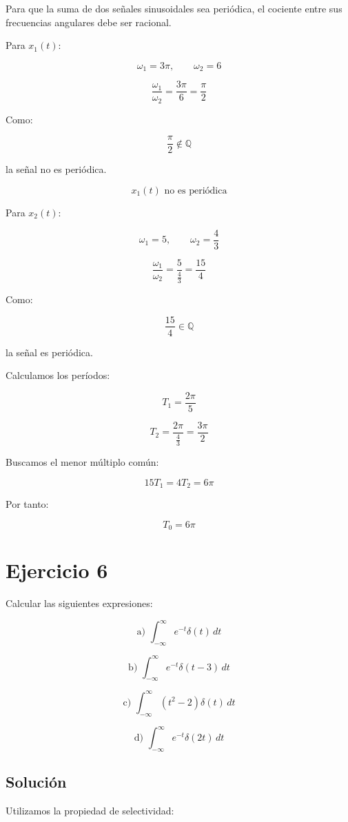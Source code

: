 \documentclass[fleqn]{article}
\begin{document}
	Para que la suma de dos señales sinusoidales sea periódica, el cociente entre sus frecuencias angulares debe ser racional.

	Para $x_1(t)$:

	\[
	\omega_1=3\pi,
	\qquad
	\omega_2=6
	\]

	\[
	\frac{\omega_1}{\omega_2}
	=
	\frac{3\pi}{6}
	=
	\frac{\pi}{2}
	\]

	Como:

	\[
	\frac{\pi}{2}\notin\mathbb{Q}
	\]

	la señal no es periódica.

	\[
	\boxed{
	x_1(t)\text{ no es periódica}
	}
	\]

	Para $x_2(t)$:

	\[
	\omega_1=5,
	\qquad
	\omega_2=\frac{4}{3}
	\]

	\[
	\frac{\omega_1}{\omega_2}
	=
	\frac{5}{\frac{4}{3}}
	=
	\frac{15}{4}
	\]

	Como:

	\[
	\frac{15}{4}\in\mathbb{Q}
	\]

	la señal es periódica.

	Calculamos los períodos:

	\[
	T_1
	=
	\frac{2\pi}{5}
	\]

	\[
	T_2
	=
	\frac{2\pi}{\frac{4}{3}}
	=
	\frac{3\pi}{2}
	\]

	Buscamos el menor múltiplo común:

	\[
	15T_1
	=
	4T_2
	=
	6\pi
	\]

	Por tanto:

	\[
	\boxed{
	T_0=6\pi
	}
	\]

\section{Ejercicio 6}
	Calcular las siguientes expresiones:

	\[
	\text{a) }\int_{-\infty}^{\infty}e^{-t}\delta(t)\,dt
	\]

	\[
	\text{b) }\int_{-\infty}^{\infty}e^{-t}\delta(t-3)\,dt
	\]

	\[
	\text{c) }\int_{-\infty}^{\infty}(t^2-2)\delta(t)\,dt
	\]

	\[
	\text{d) }\int_{-\infty}^{\infty}e^{-t}\delta(2t)\,dt
	\]

	\subsection{Solución}

	Utilizamos la propiedad de selectividad:
\end{document}
